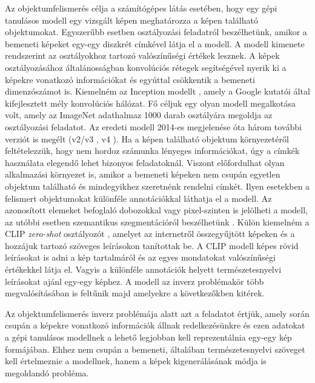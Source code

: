 
Az objektumfelismerés célja a számítógépes látás esetében, hogy egy gépi tanulásos modell egy vizsgált képen meghatározza a képen található objektumokat. Egyszerűbb esetben osztályozási feladatról beszélhetünk, amikor a bemeneti képeket egy-egy diszkrét címkével látja el a modell. A modell kimenete rendszerint az osztályokhoz tartozó valószínűségi értékek lesznek. A képek osztályozásához általánosságban konvolúciós rétegek segítségével nyerik ki a képekre vonatkozó információkat és egyúttal csökkentik a bemeneti dimenzószámot is. Kiemelném az Inception modellt \cite{szegedy2015going}, amely a Google kutatói által kifejlesztett mély konvolúciós hálózat. Fő céljuk egy olyan modell megalkotása volt, amely az ImageNet adathalmaz \cite{deng2009imagenet} 1000 darab osztályára megoldja az osztályozási feladatot. Az eredeti modell 2014-es megjelenése óta három további verziót is megélt (v2/v3 \cite{szegedy2016rethinking}, v4 \cite{szegedy2017inception}).
Ha a képen található objektum környezetéről feltételezzük, hogy nem hordoz számunka lényeges információkat, úgy a címkék használata elegendő lehet bizonyos feladatoknál. Viszont előfordulhat olyan alkalmazási környezet is, amikor a bemeneti képeken nem csupán egyetlen objektum található és mindegyikhez szeretnénk rendelni címkét. Ilyen esetekben a felismert objektumokat különféle annotációkkal láthatja el a modell. Az azonosított elemeket befoglaló dobozokkal \cite{redmon2016you} vagy pixel-szinten is jelölheti a modell, az utóbbi esetben szemantikus szegmentációról beszélhetünk \cite{long2015fully}.
Külön kiemelném a CLIP \textit{zero-shot} osztályozót \cite{radford2021learning}, amelyet az internetről összegyűjtött képeken és a hozzájuk tartozó szöveges leírásokon tanítottak be. A CLIP modell képes rövid leírásokat is adni a kép tartalmáról és az egyes mondatokat valószínűségi értékekkel látja el. Vagyis a különféle annotációk helyett természetesnyelvi leírásokat ajánl egy-egy képhez. A modell az inverz problémakör több megvalósításában is feltűnik majd amelyekre a következőkben kitérek.




Az objektumfelismerés inverz problémája alatt azt a feladatot értjük, amely során csupán a képekre vonatkozó információk állnak redelkezésünkre és ezen adatokat a gépi tanulásos modellnek a lehető legjobban kell reprezentálnia egy-egy kép formájában. 
Ehhez nem csupán a bemeneti, általában természetesnyelvi szöveget kell értelmeznie a modellnek, hanem a képek kigenerálásának módja is megoldandó probléma.


